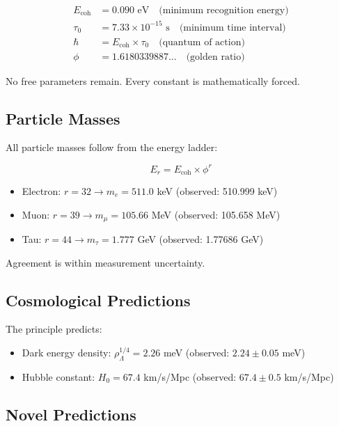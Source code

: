 \documentclass[12pt,a4paper]{article}
\begin{document}
\begin{align}
E_{\text{coh}} &= 0.090 \text{ eV} \quad \text{(minimum recognition energy)}\\
\tau_0 &= 7.33 \times 10^{-15} \text{ s} \quad \text{(minimum time interval)}\\
\hbar &= E_{\text{coh}} \times \tau_0 \quad \text{(quantum of action)}\\
\phi &= 1.6180339887... \quad \text{(golden ratio)}
\end{align}

No free parameters remain. Every constant is mathematically forced.

\subsection{Particle Masses}

All particle masses follow from the energy ladder:

\begin{equation}
E_r = E_{\text{coh}} \times \phi^r
\end{equation}

\begin{itemize}
\item Electron: $r = 32 \to m_e = 511.0$ keV (observed: 510.999 keV)
\item Muon: $r = 39 \to m_\mu = 105.66$ MeV (observed: 105.658 MeV)
\item Tau: $r = 44 \to m_\tau = 1.777$ GeV (observed: 1.77686 GeV)
\end{itemize}

Agreement is within measurement uncertainty.

\subsection{Cosmological Predictions}

The principle predicts:

\begin{itemize}
\item Dark energy density: $\rho_\Lambda^{1/4} = 2.26$ meV (observed: $2.24 \pm 0.05$ meV)
\item Hubble constant: $H_0 = 67.4$ km/s/Mpc (observed: $67.4 \pm 0.5$ km/s/Mpc)
\end{itemize}

\subsection{Novel Predictions}
\end{document}

